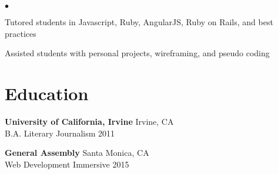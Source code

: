\documentclass[margin,line]{res}
\newenvironment{list2}{
  \begin{list}{$\bullet$}{%
      \setlength{\itemsep}{0in}
      \setlength{\parsep}{0in} \setlength{\parskip}{0in}
      \setlength{\topsep}{0in} \setlength{\partopsep}{0in}
      \setlength{\leftmargin}{0.2in}}}{\end{list}}
\begin{document}
\begin{resume}
\begin{list2}
\item Tutored students in Javascript, Ruby, AngularJS, Ruby on Rails, and best practices
\item Assisted students with personal projects, wireframing, and pseudo coding
\end{list2}

\section{\sc Education}
{\bf University of California, Irvine} \hfill{Irvine, CA} \\
\vspace{-0.3cm}
B.A. Literary Journalism \hfill{2011} \\
\vspace{-0.3cm}

{\bf General Assembly} \hfill{Santa Monica, CA} \\
\vspace{-0.3cm}
Web Development Immersive \hfill{2015} \\
\vspace{-0.3cm}

\end{resume}
\end{document}
